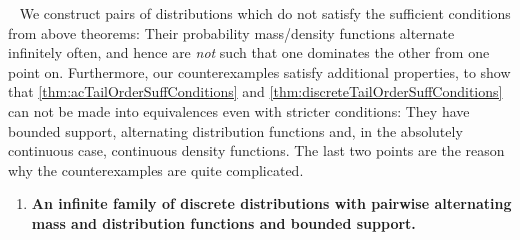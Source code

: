 \documentclass[a4paper]{scrreprt}
\begin{document}
    \begin{ex}~
        \label{ex:tailOrderSufficientConditionsCounterexamples}
        We construct pairs of distributions which do not satisfy the sufficient conditions from above theorems:
        Their probability mass/density functions alternate infinitely often, and hence are \emph{not} such that one dominates the other from one point on.
        Furthermore, our counterexamples satisfy additional properties, to show that \ref{thm:acTailOrderSuffConditions} and \ref{thm:discreteTailOrderSuffConditions} can not be made into equivalences even with stricter conditions:
        They have bounded support, alternating distribution functions and, in the absolutely continuous case, continuous density functions.
        The last two points are the reason why the counterexamples are quite complicated.
    
        \begin{enumerate}
            \item
            \textbf{An infinite family of discrete distributions with pairwise alternating mass and distribution functions and bounded support.}
            

\end{enumerate}
\end{ex}
\end{document}
